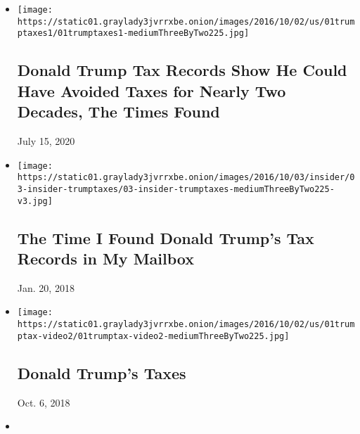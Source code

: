 \begin{itemize}
\item
  \href{https://www.nytimes3xbfgragh.onion/2016/10/02/us/politics/donald-trump-taxes.html}{}

  \texttt{[image: https://static01.graylady3jvrrxbe.onion/images/2016/10/02/us/01trumptaxes1/01trumptaxes1-mediumThreeByTwo225.jpg]}

  \hypertarget{donald-trump-tax-records-show-he-could-have-avoided-taxes-for-nearly-two-decades-the-times-found}{%
  \subsection{Donald Trump Tax Records Show He Could Have Avoided Taxes
  for Nearly Two Decades, The Times
  Found}\label{donald-trump-tax-records-show-he-could-have-avoided-taxes-for-nearly-two-decades-the-times-found}}

  July 15, 2020
\item
  \href{https://www.nytimes3xbfgragh.onion/2016/10/03/insider/the-time-i-found-donald-trumps-tax-records-in-my-mailbox.html}{}

  \texttt{[image: https://static01.graylady3jvrrxbe.onion/images/2016/10/03/insider/03-insider-trumptaxes/03-insider-trumptaxes-mediumThreeByTwo225-v3.jpg]}

  \hypertarget{the-time-i-found-donald-trumps-tax-records-in-my-mailbox}{%
  \subsection{The Time I Found Donald Trump's Tax Records in My
  Mailbox}\label{the-time-i-found-donald-trumps-tax-records-in-my-mailbox}}

  Jan. 20, 2018
\item
  \href{https://www.nytimes3xbfgragh.onion/video/us/politics/100000004684657/donald-trumps-taxes.html}{}

  \texttt{[image: https://static01.graylady3jvrrxbe.onion/images/2016/10/02/us/01trumptax-video2/01trumptax-video2-mediumThreeByTwo225.jpg]}

  \hypertarget{donald-trumps-taxes}{%
  \subsection{Donald Trump's Taxes}\label{donald-trumps-taxes}}

  Oct. 6, 2018
\item
  \href{https://www.nytimes3xbfgragh.onion/interactive/2016/10/01/us/politics/donald-trump-taxes.html}{}


\end{itemize}
